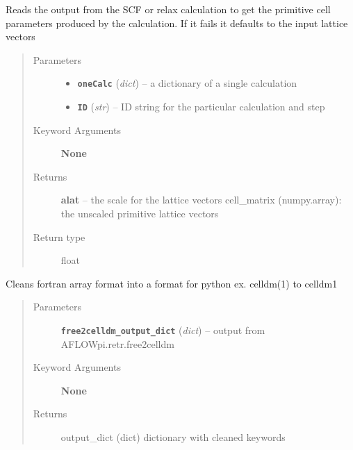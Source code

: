 \documentclass[letterpaper,10pt,english]{sphinxmanual}
\begin{document}
\begin{fulllineitems}
\label{retr:retr.__getCellParams}
Reads the output from the SCF or relax calculation to get the primitive cell parameters
produced by the calculation. If it fails it defaults to the input lattice vectors
\begin{quote}\begin{description}
\item[{Parameters}] \leavevmode\begin{itemize}
\item {} 
\textbf{\texttt{oneCalc}} (\emph{dict}) -- a dictionary of a single calculation

\item {} 
\textbf{\texttt{ID}} (\emph{str}) -- ID string for the particular calculation and step

\end{itemize}

\item[{Keyword Arguments}] \leavevmode
\textbf{None}

\item[{Returns}] \leavevmode
\textbf{alat} --
the scale for the lattice vectors
cell\_matrix (numpy.array): the unscaled primitive lattice vectors

\item[{Return type}] \leavevmode
float

\end{description}\end{quote}

\end{fulllineitems}


\begin{fulllineitems}
\label{retr:retr.__getCelldm2freeDict}
Cleans fortran array format into a format for python ex. celldm(1) to celldm1
\begin{quote}\begin{description}
\item[{Parameters}] \leavevmode
\textbf{\texttt{free2celldm\_output\_dict}} (\emph{dict}) -- output from AFLOWpi.retr.free2celldm

\item[{Keyword Arguments}] \leavevmode
\textbf{None}

\item[{Returns}] \leavevmode
output\_dict (dict) dictionary with cleaned keywords

\end{description}\end{quote}

\end{fulllineitems}
\end{document}
